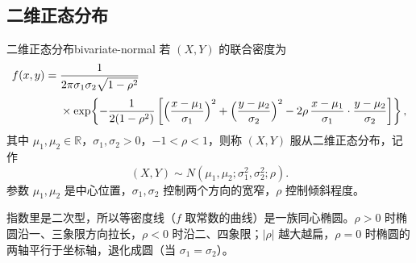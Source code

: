 \subsection{二维正态分布}

\begin{mydef}{二维正态分布}{bivariate-normal}
若 $(X,Y)$ 的联合密度为
\[
\begin{aligned}
f(x,y)={}&\frac{1}{2\pi\sigma_1\sigma_2\sqrt{1-\rho^2}}\\[2pt]
&\times\exp\!\left\{-\frac{1}{2(1-\rho^2)}
\left[\Bigl(\frac{x-\mu_1}{\sigma_1}\Bigr)^2+\Bigl(\frac{y-\mu_2}{\sigma_2}\Bigr)^2
-2\rho\,\frac{x-\mu_1}{\sigma_1}\cdot\frac{y-\mu_2}{\sigma_2}\right]\right\},
\end{aligned}
\]
其中 $\mu_1,\mu_2\in\mathbb R$，$\sigma_1,\sigma_2>0$，$-1<\rho<1$，则称 $(X,Y)$ 服从二维正态分布，记作
\[
(X,Y)\sim N(\mu_1,\mu_2;\sigma_1^2,\sigma_2^2;\rho).
\]
参数 $\mu_1,\mu_2$ 是中心位置，$\sigma_1,\sigma_2$ 控制两个方向的宽窄，$\rho$ 控制倾斜程度。
\end{mydef}

指数里是二次型，所以等密度线（$f$ 取常数的曲线）是一族同心椭圆。$\rho>0$ 时椭圆沿一、三象限方向拉长，$\rho<0$ 时沿二、四象限；$|\rho|$ 越大越扁，$\rho=0$ 时椭圆的两轴平行于坐标轴，退化成圆（当 $\sigma_1=\sigma_2$）。

